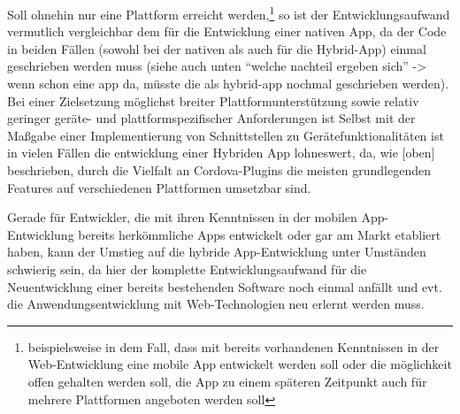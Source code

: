 Soll ohnehin nur eine Plattform erreicht werden,\footnote{beispielsweise in dem Fall, dass mit bereits vorhandenen Kenntnissen in der Web-Entwicklung eine mobile App entwickelt werden soll oder die möglichkeit offen gehalten werden soll, die App zu einem späteren Zeitpunkt auch für mehrere Plattformen angeboten werden soll} so ist der Entwicklungsaufwand vermutlich vergleichbar dem für die Entwicklung einer nativen App, da der Code in beiden Fällen (sowohl bei der nativen als auch für die Hybrid-App) einmal geschrieben werden muss (siehe auch unten “welche nachteil ergeben sich” -> wenn schon eine app da, müsste die als hybrid-app nochmal geschrieben werden).
Bei einer Zielsetzung möglichst breiter Plattformunterstützung sowie relativ geringer geräte- und plattformspezifischer Anforderungen ist 
Selbst mit der Maßgabe einer Implementierung von Schnittstellen zu Gerätefunktionalitäten ist in vielen Fällen die entwicklung einer Hybriden App lohneswert, da, wie [oben] beschrieben, durch die Vielfalt an Cordova-Plugins die meisten grundlegenden Features auf verschiedenen Plattformen umsetzbar sind. 


Gerade für Entwickler, die mit ihren Kenntnissen in der mobilen App-Entwicklung bereits herkömmliche Apps entwickelt oder gar am Markt etabliert haben, kann der Umstieg auf die hybride App-Entwicklung unter Umständen schwierig sein, da hier der komplette Entwicklungsaufwand für die Neuentwicklung einer bereits bestehenden Software noch einmal anfällt und evt. die Anwendungsentwicklung mit Web-Technologien neu erlernt werden muss.







